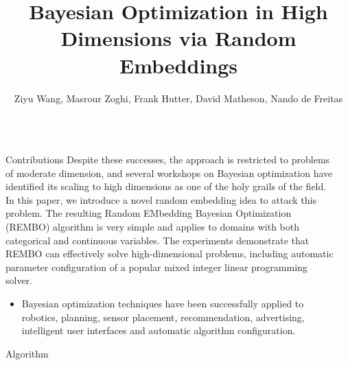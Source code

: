 \documentclass[final]{beamer}
\title{Bayesian Optimization in High Dimensions via Random Embeddings}
\author{Ziyu Wang, Masrour Zoghi, Frank Hutter, 
David Matheson, Nando de Freitas}
\institute{
Computer Science Department, University of British Columbia}
\begin{document}
\begin{frame}[t]
\begin{columns}[T]
\begin{column}{.48\textwidth}

\begin{block}{Contributions}
 Despite these successes, the approach is restricted to problems of moderate dimension, and several 
workshops on Bayesian optimization have identified its scaling to high dimensions as one of the holy grails of the field. 
In this paper, we introduce a novel random embedding idea to attack this problem.
The resulting Random EMbedding Bayesian Optimization (REMBO) algorithm is very simple
and applies to domains with both categorical and continuous variables. 
The experiments demonstrate that REMBO can effectively solve high-dimensional problems, including automatic parameter configuration of a popular
mixed integer linear programming solver.
\begin{itemize}
 \item Bayesian optimization techniques have been successfully applied to robotics, planning, sensor placement, recommendation, advertising, intelligent user interfaces and automatic algorithm configuration.
\end{itemize}


\end{block}

\begin{block}{Algorithm}
 
\end{block}




\end{column}

\begin{column}{.48\textwidth}

\end{column}
\end{columns}
\end{frame}
\end{document}
